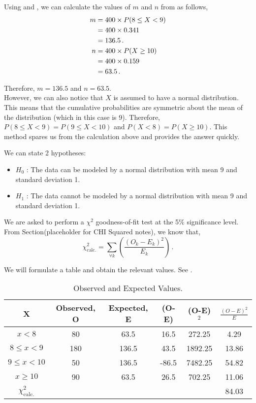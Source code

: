 \begin{subquestions}
\begin{subsubquestions}
Using  and , we can calculate the values of $m$ and $n$ from  as follows,
\begin{align}
	m & = 400 \times P(8 \leq X < 9) \nonumber \\
	  & = 400 \times 0.341 \nonumber \\
	  & = 136.5 \,. \\
    n & = 400 \times P(X \geq 10) \nonumber \\
      & = 400 \times 0.159 \nonumber \\
      & = 63.5 \,.
\end{align}

Therefore, $m=136.5$ and $n=63.5$. \\

However, we can also notice that $X$ is assumed to have a normal distribution. This means that the cumulative probabilities are symmetric about the mean of the distribution (which in this case is 9). Therefore, $P(8 \leq X < 9) = P(9 \leq X < 10)$ and $P(X < 8) = P(X \geq 10)$. This method spares us from the calculation above and provides the answer quickly.


\subsubquestion

We can state 2 hypotheses:
\begin{itemize}
	\item $H_0$ : The data can be modeled by a normal distribution with mean 9 and standard deviation 1.
	\item $H_1$ : The data cannot be modeled by a normal distribution with mean 9 and standard deviation 1.
\end{itemize}

We are asked to perform a $\chi^2$ goodness-of-fit test at the 5\% significance level. From Section(placeholder for CHI Squared notes), we know that,
\begin{equation}
	\chi^2_{\text{calc.}} = \sum_{\forall k} \left( \frac{(O_k-E_k)^2}{E_k}\right) \,.
\end{equation}

We will formulate a table and obtain the relevant values. See .
\begin{table}[ht]
	\centering
	\begin{tabular}{|c|c|c|c|c|c|}
		\hline 
		X & Observed, O & Expected, E & (O-E) & (O-E)$^2$ & $\frac{(O-E)^2}{E}$ \\
		\hline
		$x<8$ & 80 & 63.5 & 16.5 & 272.25 & 4.29 \\
		$8 \leq x < 9$ & 180 & 136.5 & 43.5 & 1892.25 & 13.86 \\
		$9 \leq x < 10$ & 50 & 136.5 & -86.5 & 7482.25 & 54.82 \\
		$x \geq 10$ & 90 & 63.5 & 26.5 & 702.25 & 11.06 \\
		\hline
		$\chi^2_{\text{calc.}}$ & & & & & 84.03 \\
		\hline
	\end{tabular}
	\caption{\label{2015:q4:tab:Chi} Observed and Expected Values.}
\end{table}


\end{subsubquestions}
\end{subquestions}
